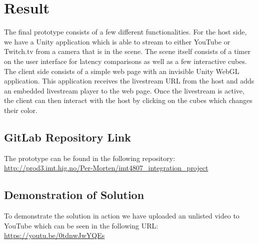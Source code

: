 \section{Result}
The final prototype consists of a few different functionalities. For the host side, we have a Unity application which is able to stream to either YouTube or Twitch.tv from a camera that is in the scene. The scene itself consists of a timer on the user interface for latency comparisons as well as a few interactive cubes. 
The client side consists of a simple web page with an invisible Unity WebGL application. This application receives the livestream URL from the host and adds an embedded livestream player to the web page. Once the livestream is active, the client can then interact with the host by clicking on the cubes which changes their color. 

\subsection{GitLab Repository Link}
The prototype can be found in the following repository: \\ \url{http://prod3.imt.hig.no/Per-Morten/imt4807_integration_project}

\subsection{Demonstration of Solution}
To demonstrate the solution in action we have uploaded an unlisted video to YouTube which can be seen in the following URL: \url{https://youtu.be/0tdnwJwYQEs}

